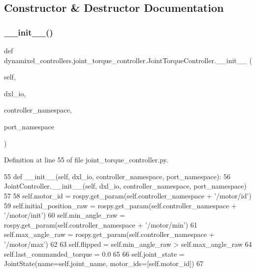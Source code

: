 \subsection{Constructor \& Destructor Documentation}
\mbox{\label{classdynamixel__controllers_1_1joint__torque__controller_1_1_joint_torque_controller_a35fda9520a2a728c7f1c40d5d8c83f13}} 
\subsubsection{\texorpdfstring{\+\_\+\+\_\+init\+\_\+\+\_\+()}{\_\_init\_\_()}}
{\footnotesize\ttfamily def dynamixel\+\_\+controllers.\+joint\+\_\+torque\+\_\+controller.\+Joint\+Torque\+Controller.\+\_\+\+\_\+init\+\_\+\+\_\+ (\begin{DoxyParamCaption}\item[{}]{self,  }\item[{}]{dxl\+\_\+io,  }\item[{}]{controller\+\_\+namespace,  }\item[{}]{port\+\_\+namespace }\end{DoxyParamCaption})}



Definition at line 55 of file joint\+\_\+torque\+\_\+controller.\+py.


\begin{DoxyCode}
55     \textcolor{keyword}{def }\_\_init\_\_(self, dxl\_io, controller\_namespace, port\_namespace):
56         JointController.\_\_init\_\_(self, dxl\_io, controller\_namespace, port\_namespace)
57         
58         self.motor\_id = rospy.get\_param(self.controller\_namespace + \textcolor{stringliteral}{'/motor/id'})
59         self.initial\_position\_raw = rospy.get\_param(self.controller\_namespace + \textcolor{stringliteral}{'/motor/init'})
60         self.min\_angle\_raw = rospy.get\_param(self.controller\_namespace + \textcolor{stringliteral}{'/motor/min'})
61         self.max\_angle\_raw = rospy.get\_param(self.controller\_namespace + \textcolor{stringliteral}{'/motor/max'})
62         
63         self.flipped = self.min\_angle\_raw > self.max\_angle\_raw
64         self.last\_commanded\_torque = 0.0
65         
66         self.joint\_state = JointState(name=self.joint\_name, motor\_ids=[self.motor\_id])
67 
\end{DoxyCode}


